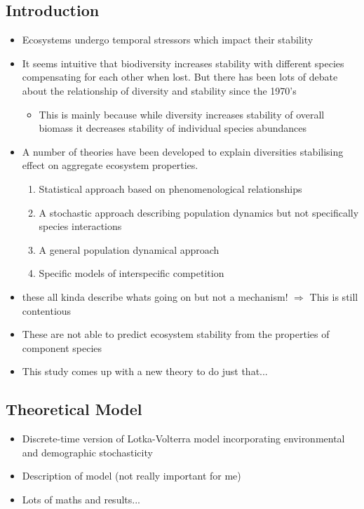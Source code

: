 \subsection*{Introduction}
\begin{itemize}
	\item Ecosystems undergo temporal stressors which impact their stability
	\item It seems intuitive that biodiversity increases stability with different species compensating for each other when lost. But there has been lots of debate about the relationship of diversity and stability since the 1970's
	\begin{itemize}
		\item This is mainly because while diversity increases stability of overall biomass it decreases stability of individual species abundances
	\end{itemize}
	\item A number of theories have been developed to explain diversities stabilising effect on aggregate ecosystem properties.
	\begin{enumerate}
		\item Statistical approach based on phenomenological relationships
		\item A stochastic approach describing population dynamics but not specifically species interactions
		\item A general population dynamical approach
		\item Specific models of interspecific competition 
	\end{enumerate}
	\item these all kinda describe whats going on but not a mechanism! $\Rightarrow$ This is still contentious
	\item These are not able to predict ecosystem stability from the properties of component species
	\item This study comes up with a new theory to do just that...
	\end{itemize}

\subsection*{Theoretical Model}
\begin{itemize}
	\item Discrete-time version of Lotka-Volterra model incorporating environmental and demographic stochasticity
	\item Description of model (not really important for me)
	\item Lots of maths and results...  
\end{itemize}

